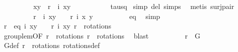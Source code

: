 \begin{isabellebody}
\ \ \ \ \ \ \isamarkupfalse%
\ \isamarkupfalse%
\ {\isachardoublequoteopen}{\isacharparenleft}x{\isacharprime}{\isacharcomma}y{\isacharprime}{\isacharparenright}\ {\isacharequal}\ {\isacharparenleft}r{\isacharprime}\ {\isasymcirc}\ i{\isacharparenright}\ {\isacharparenleft}x{\isacharcomma}y{\isacharparenright}{\isachardoublequoteclose}\ \isanewline
\ \ \ \ \ \ \ \ \isamarkupfalse%
\ tau{\isacharunderscore}sq\ \isamarkupfalse%
{\isacharparenleft}simp\ del{\isacharcolon}\ {\isasymtau}{\isachardot}simps{\isacharparenright}\ \isamarkupfalse%
\ {\isacharparenleft}metis\ surj{\isacharunderscore}pair{\isacharparenright}\isanewline
\ \ \ \ \ \ \isamarkupfalse%
\ \isamarkupfalse%
\ {\isachardoublequoteopen}{\isacharparenleft}r{\isacharprime}\ {\isasymcirc}\ i{\isacharparenright}\ {\isacharparenleft}x{\isacharcomma}y{\isacharparenright}\ {\isacharequal}\ {\isacharparenleft}{\isasymtau}\ {\isasymcirc}\ r{\isacharparenright}\ {\isacharparenleft}i\ {\isacharparenleft}x{\isacharcomma}\ y{\isacharparenright}{\isacharparenright}{\isachardoublequoteclose}\isanewline
\ \ \ \ \ \ \ \ \isamarkupfalse%
\ eq\ \isamarkupfalse%
\ simp\isanewline
\ \ \ \ \ \ \isamarkupfalse%
\ \isamarkupfalse%
\ r{\isacharprime}{\isacharprime}\ \ eq{}{\isacharcolon}\ {\isachardoublequoteopen}i\ {\isacharparenleft}x{\isacharcomma}y{\isacharparenright}\ {\isacharequal}\ {\isacharparenleft}{\isasymtau}\ {\isasymcirc}\ r{\isacharprime}{\isacharprime}{\isacharparenright}\ {\isacharparenleft}i\ {\isacharparenleft}x{\isacharcomma}y{\isacharparenright}{\isacharparenright}{\isachardoublequoteclose}\ {\isachardoublequoteopen}r{\isacharprime}{\isacharprime}\ {\isasymin}\ rotations{\isachardoublequoteclose}\isanewline
\ \ \ \ \ \ \ \ \isamarkupfalse%
\ group{\isacharunderscore}lem{\isacharbrackleft}OF\ {\isacartoucheopen}r{\isacharprime}\ {\isasymin}\ rotations{\isacartoucheclose}\ {\isacartoucheopen}r\ {\isasymin}\ rotations{\isacartoucheclose}{\isacharbrackright}\ \isamarkupfalse%
\ blast\isanewline
\ \ \ \ \ \ \isamarkupfalse%
\ {\isachardoublequoteopen}{\isasymtau}\ {\isasymcirc}\ r{\isacharprime}{\isacharprime}\ {\isasymin}\ G{\isachardoublequoteclose}\ \isanewline
\ \ \ \ \ \ \ \ \isamarkupfalse%
\ G{\isacharunderscore}def\ {\isacartoucheopen}r{\isacharprime}{\isacharprime}\ {\isasymin}\ rotations{\isacartoucheclose}\ rotations{\isacharunderscore}def\ \isanewline

\end{isabellebody}
